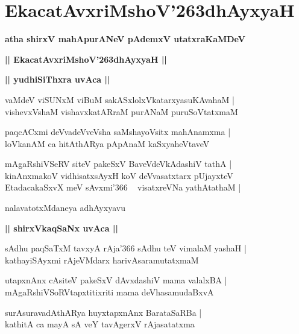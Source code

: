 \documentclass[twoside,12pt,openright]{book}
\def\S{\char'263}
\newcounter{shloka}[chapter]
\def\uvaca#1{\centerline{{\large\textbf{#1}}}}
\begin{document}
\chapter{EkacatAvxriMshoV\S dhAyxyaH}

\begin{center}
{\LARGE\bfseries atha shirxV mahApurANeV pAdemxV utatxraKaMDeV}
\end{center}

\begin{center}
{\LARGE\bfseries || EkacatAvxriMshoV\S dhAyxyaH ||}
\end{center}

\uvaca{|| yudhiSiThxra uvAca ||}

\begin{shloka}%
vaMdeV viSUNxM viBuM sakASxlolxVkatarxyasuKAvahaM |\\
vishevxVshaM vishavxkatARraM purANaM puruSoVtatxmaM 
\end{shloka}

\begin{shloka}%
paqcACxmi deVvadeVveVsha saMshayoVsitx mahAnamxma |\\
loVkanAM ca hitAthARya pApAnaM kaSxyaheVtaveV
\end{shloka}

\begin{shloka}%
mAgaRshiVSeRV siteV pakeSxV BaveVdeVkAdashiV tathA |\\
kinAnxmakoV vidhisatxsAyxH koV deVvasatxtarx pUjayxteV \\
EtadacakaSxvX meV sAvxmi\char'366 ~ visatxreVNa yathAtathaM |
\end{shloka}

\begin{center}
nalavatotxMdaneya adhAyxyavu
\end{center}

\uvaca{|| shirxVkaqSaNx uvAca ||}

\begin{shloka}%
sAdhu paqSaTxM tavxyA rAja\char'366 sAdhu teV vimalaM yashaH |\\
kathayiSAyxmi rAjeVMdarx harivAsaramutatxmaM
\end{shloka}

\begin{shloka}%
utapxnAnx cAsiteV pakeSxV dAvxdashiV mama valalxBA |\\
mAgaRshiVSoRVtapxtitixriti mama deVhasamudaBxvA
\end{shloka}

\begin{shloka}%
surAsuravadAthARya huyxtapxnAnx BarataSaRBa |\\
kathitA ca mayA sA veY tavAgerxV rAjasatatxma 
\end{shloka}
\end{document}
